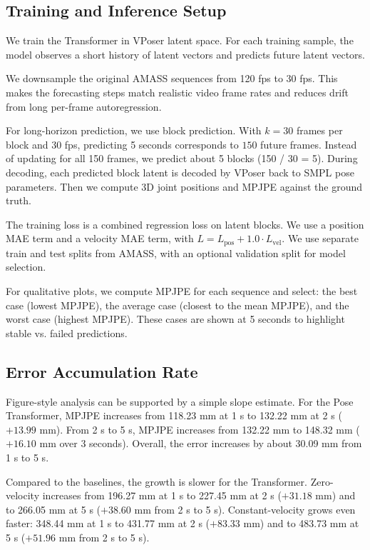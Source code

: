 \documentclass[10pt,twocolumn]{article}
\begin{document}
\subsection{Training and Inference Setup}
We train the Transformer in VPoser latent space.
For each training sample, the model observes a short history of latent vectors and predicts future latent vectors.

We downsample the original AMASS sequences from 120 fps to 30 fps.
This makes the forecasting steps match realistic video frame rates and reduces drift from long per-frame autoregression.

For long-horizon prediction, we use block prediction.
With $k=30$ frames per block and 30 fps, predicting 5 seconds corresponds to $150$ future frames.
Instead of updating for all 150 frames, we predict about 5 blocks (150 / 30 = 5).
During decoding, each predicted block latent is decoded by VPoser back to SMPL pose parameters.
Then we compute 3D joint positions and MPJPE against the ground truth.

The training loss is a combined regression loss on latent blocks.
We use a position MAE term and a velocity MAE term, with
$L = L_{\text{pos}} + 1.0 \cdot L_{\text{vel}}$.
We use separate train and test splits from AMASS, with an optional validation split for model selection.

For qualitative plots, we compute MPJPE for each sequence and select:
the best case (lowest MPJPE),
the average case (closest to the mean MPJPE),
and the worst case (highest MPJPE).
These cases are shown at 5 seconds to highlight stable vs. failed predictions.


\subsection{Error Accumulation Rate}
Figure-style analysis can be supported by a simple slope estimate.
For the Pose Transformer, MPJPE increases from 118.23 mm at 1 s to 132.22 mm at 2 s ($+13.99$ mm).
From 2 s to 5 s, MPJPE increases from 132.22 mm to 148.32 mm ($+16.10$ mm over 3 seconds).
Overall, the error increases by about 30.09 mm from 1 s to 5 s.

Compared to the baselines, the growth is slower for the Transformer.
Zero-velocity increases from 196.27 mm at 1 s to 227.45 mm at 2 s ($+31.18$ mm) and to 266.05 mm at 5 s ($+38.60$ mm from 2 s to 5 s).
Constant-velocity grows even faster: 348.44 mm at 1 s to 431.77 mm at 2 s ($+83.33$ mm) and to 483.73 mm at 5 s ($+51.96$ mm from 2 s to 5 s).
\end{document}
